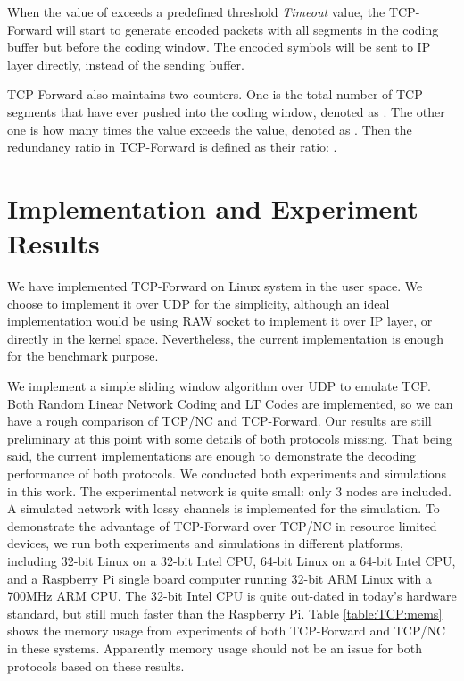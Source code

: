 \documentclass[10pt, conference, final, letterpaper]{IEEEtran}
\theoremstyle{definition}
\begin{document}
When the value of  exceeds a predefined threshold \textit{Timeout} value, the TCP-Forward will start to generate encoded packets with all segments in the coding buffer but before the coding window. The encoded symbols will be sent to IP layer directly, instead of the sending buffer.

TCP-Forward also maintains two counters. One is the total number of TCP segments that have ever pushed into the coding window, denoted as . The other one is how many times the  value exceeds the  value, denoted as . Then the redundancy ratio in TCP-Forward is defined as their ratio: .

\section{Implementation and Experiment Results}
\label{sec:TCP-Forward:experiment}

We have implemented TCP-Forward on Linux system in the user space. We choose to implement it over UDP for the simplicity, although an ideal implementation would be using RAW socket to implement it over IP layer, or directly in the kernel space. Nevertheless, the current implementation is enough for the benchmark purpose.

We implement a simple sliding window algorithm over UDP to emulate TCP. Both Random Linear Network Coding and LT Codes are implemented, so we can have a rough comparison of TCP/NC and TCP-Forward. Our results are still preliminary at this point with some details of both protocols missing. That being said, the current implementations are enough to demonstrate the decoding performance of both protocols. We conducted both experiments and simulations in this work. The experimental network is quite small: only 3 nodes are included. A simulated network with lossy channels is implemented for the simulation. To demonstrate the advantage of TCP-Forward over TCP/NC in resource limited devices, we run both experiments and simulations in different platforms, including 32-bit Linux on a 32-bit Intel CPU, 64-bit Linux on a 64-bit Intel CPU, and a Raspberry Pi \cite{rpi} single board computer running 32-bit ARM Linux with a 700MHz ARM CPU. The 32-bit Intel CPU is quite out-dated in today's hardware standard, but still much faster than the Raspberry Pi. Table \ref{table:TCP:mems} shows the memory usage from experiments of both TCP-Forward and TCP/NC in these systems. Apparently memory usage should not be an issue for both protocols based on these results.
\end{document}
